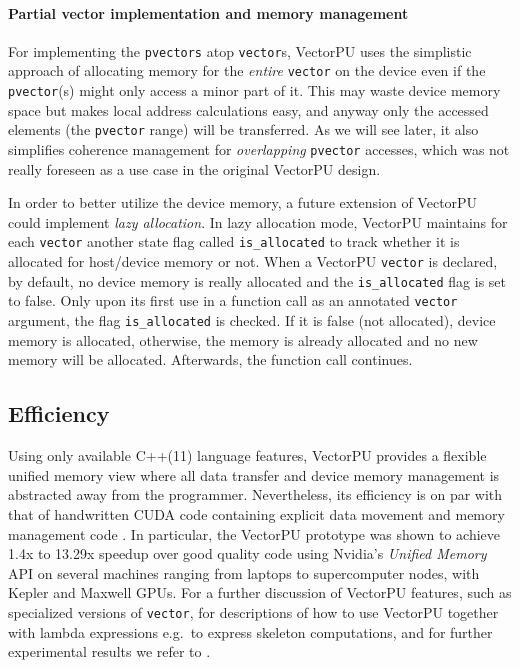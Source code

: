 \paragraph{Partial vector implementation and memory management}
For implementing the \texttt{pvectors} atop \texttt{vector}s, 
VectorPU uses the simplistic approach of allocating memory for
the \emph{entire} \texttt{vector} on the device 
even if the \texttt{pvector}(s) might only
access a minor part of it. This may waste device memory space 
but makes local address calculations easy, and anyway only
the accessed elements (the \texttt{pvector} range) will be transferred.
As we will see later, it also simplifies coherence management
for \emph{overlapping} \texttt{pvector} accesses, which was not 
really foreseen as a use case in the original VectorPU design.

In order to better utilize the device memory,
a future extension of VectorPU could implement 
\emph{lazy allocation}.
In lazy allocation mode, VectorPU maintains for each 
\texttt{vector} another state
flag called \texttt{is\_allocated}
to track whether it is allocated for host/device memory or not.
When a VectorPU \texttt{vector} is declared,
by default, no device memory is really allocated and the \texttt{is\_allocated} flag is set to false.
Only upon its first use in a function call as an
annotated \texttt{vector} argument,
the flag \texttt{is\_allocated} is checked.
If it is false (not allocated), device memory is allocated,
otherwise, the memory is already allocated and no new memory will be allocated.
Afterwards, the function call continues.

\subsection{Efficiency}

Using only available C++(11) language features, 
VectorPU provides a flexible unified memory
view where all data transfer and device memory management
is abstracted away from the programmer. Nevertheless,
its efficiency is on par with that of handwritten CUDA code
containing explicit data movement and memory management code
\cite{VectorPU-2017}.
In particular, the VectorPU prototype was shown to
achieve 1.4x to 13.29x speedup over good quality
code using Nvidia's \textit{Unified Memory} API
on several machines ranging from laptops to supercomputer nodes,
with Kepler and Maxwell GPUs. For a further discussion of
VectorPU features, such as
specialized versions of \verb-vector-, for descriptions
of how to use VectorPU together with lambda expressions 
e.g.\ to express skeleton computations, and for further
experimental results 
we refer to \cite{VectorPU-2017}.
